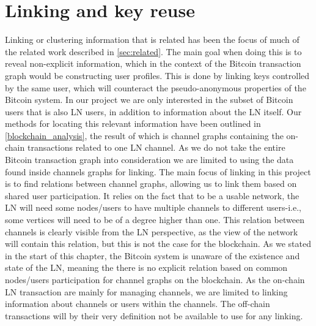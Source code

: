 \section{Linking and key reuse}
\label{sec:linking}

Linking or clustering information that is related has been the focus of much of the related work described in \cref{sec:related}. The main goal when doing this is to reveal non-explicit information, which in the context of the Bitcoin transaction graph would be constructing user profiles. 
This is done by linking keys controlled by the same user, which will counteract the pseudo-anonymous properties of the Bitcoin system. In our project we are only interested in the subset of Bitcoin users that is also LN users, in addition to information about the LN itself. 
Our methods for locating this relevant information have been outlined in \cref{blockchain_analysis}, the result of which is channel graphs containing the on-chain transactions related to one LN channel. 
As we do not take the entire Bitcoin transaction graph into consideration we are limited to using the data found inside channels graphs for linking. The main focus of linking in this project is to find relations between channel graphs, allowing us to link them based on shared user participation.
It relies on the fact that to be a usable network, the LN will need some nodes/users to have multiple channels to different users-i.e., some vertices will need to be of a degree higher than one. This relation between channels is clearly visible from the LN perspective, as the view of the network will contain this relation, but this is not the case for the blockchain. As we stated in the start of this chapter, the Bitcoin system is unaware of the existence and state of the LN, meaning the there is no explicit relation based on common nodes/users participation for channel graphs on the blockchain. As the on-chain LN transaction are mainly for managing channels, we are limited to linking information about channels or users within the channels. The off-chain transactions will by their very definition not be available to use for any linking.
\\

